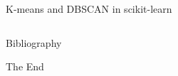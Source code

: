 \documentclass[aspectratio=169]{beamer}
\begin{document}
\begin{frame}[fragile]{K-means and DBSCAN in scikit-learn}
\inputminted{python}{example_sklearn_clustering.py}
\end{frame}



\begin{frame}[allowframebreaks]{Bibliography}
    
    
\end{frame}




\begin{frame}
    \Huge{\centerline{The End}}
\end{frame}
\end{document}
